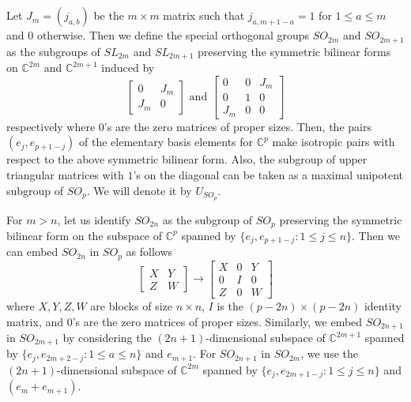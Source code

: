 \documentclass[11pt]{amsart}
\numberwithin{equation}{subsection}
\begin{document}
\subsection{}\label{sym-space}

Let $J_{m}=(j_{a,b})$ be the $m \times m$ matrix such that $j_{a,m+1-a}=1$ for 
$1\leq a\leq m$ and $0$ otherwise. Then we define the special orthogonal
groups ${SO}_{2m}$ and ${SO}_{2m+1}$ as the subgroups of ${SL}_{2m}$ and 
${SL}_{2m+1}$ preserving the symmetric bilinear forms on $\mathbb{C}^{2m}$ and 
$\mathbb{C}^{2m+1}$ induced by 
\begin{equation*}
\left[ 
\begin{array}{cc}
0 & J_{m} \\ 
J_{m} & 0\end{array}\right] \text{ and\ }\left[ 
\begin{array}{ccc}
0 & 0 & J_{m} \\ 
0 & 1 & 0 \\ 
J_{m} & 0 & 0\end{array}\right]
\end{equation*}
respectively where $0$'s are the zero matrices of proper sizes. Then, the pairs
$(e_{j}, e_{p+1-j})$ of the elementary basis elements for $\mathbb{C}^p$ make 
isotropic pairs with respect to the above symmetric bilinear form. Also, the subgroup of upper 
triangular matrices with $1$'s on the diagonal can be taken as a maximal unipotent 
subgroup of ${SO}_p$. We will denote it by $U_{{SO}_{p}}$.

\smallskip

For $m>n$, let us identify ${SO}_{2n}$ as the subgroup of ${SO}_{p}$
preserving the symmetric bilinear form on the subspace of $\mathbb{C}^{p}$
spanned by $\{e_{j},e_{p+1-j}:1\leq j\leq n\}$. Then we can embed 
${SO}_{2n}$ in ${SO}_{p}$ as follows
\begin{equation*}
\left[ 
\begin{array}{cc}
X & Y \\ 
Z & W\end{array}\right] \rightarrow \left[ 
\begin{array}{ccc}
X & 0 & Y \\ 
0 & I & 0 \\ 
Z & 0 & W\end{array}\right]
\end{equation*}
where $X,Y,Z,W$ are blocks of size $n \times n$, $I$ is the $(p-2n) \times (p-2n)$ 
identity matrix, and $0$'s are the zero matrices of proper sizes.
Similarly, we embed ${SO}_{2n+1}$ in ${SO}_{2m+1}$ by
considering the $(2n+1)$-dimensional subspace of $\mathbb{C}^{2m+1}$ spanned
by $\{e_{j},e_{2m+2-j}:1\leq a\leq n\}$ and $e_{m+1}$.
For ${SO}_{2n+1}$ in ${SO}_{2m}$, we use the $(2n+1)$-dimensional subspace
of $\mathbb{C}^{2m}$ spanned by $\{e_{j},e_{2m+1-j}:1\leq j\leq n\}$ and $(e_{m}+e_{m+1})$.
\end{document}

